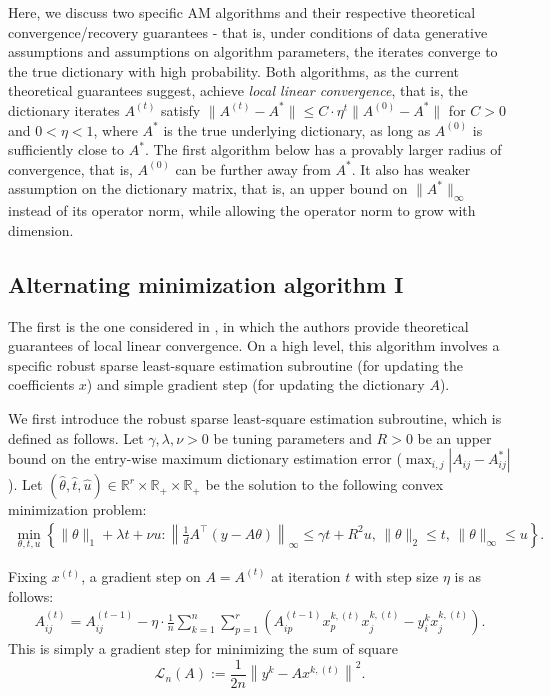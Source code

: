 Here, we discuss two specific AM algorithms and their respective theoretical convergence/recovery guarantees - that is, under conditions of data generative assumptions and assumptions on algorithm parameters, the iterates converge to the true dictionary with high probability. Both algorithms, as the current theoretical guarantees suggest, achieve \textit{local linear convergence}, that is, the dictionary iterates $A^{(t)}$ satisfy $\|A^{(t)} - A^*\| \leq C \cdot \eta^t \|A^{(0)} - A^*\|$ for $C>0$ and $0<\eta<1$, where $A^*$ is the true underlying dictionary, as long as $A^{(0)}$ is sufficiently close to $A^*$. The first algorithm below has a provably larger radius of convergence, that is, $A^{(0)}$ can be further away from $A^*$. It also has weaker assumption on the dictionary matrix, that is, an upper bound on $\|A^*\|_\infty$ instead of its operator norm, while allowing the operator norm to grow with dimension. 

\subsection{Alternating minimization algorithm I}

The first is the one considered in \cite{chatterji2017alternating}, in which the authors provide theoretical guarantees of local linear convergence. On a high level, this algorithm involves a specific robust sparse least-square estimation subroutine (for updating the coefficients $x$) and simple gradient step (for updating the dictionary $A$).

We first introduce the robust sparse least-square estimation subroutine, which is defined as follows. Let $\gamma, \lambda, \nu > 0$ be tuning parameters and $R>0$ be an upper bound on the entry-wise maximum dictionary estimation error ($\max_{i,j} |A_{ij} - A^*_{ij}|$). Let $(\hat{\theta}, \hat{t}, \hat{u})\in \mathbb{R}^r \times \mathbb{R}_+\times \mathbb{R}_+$ be the solution to the following convex minimization problem: 
\begin{align}
    \min_{\theta,t,u}\left\{ \|\theta\|_1 + \lambda t + \nu u : \left\|\frac{1}{d} A^\top (y- A\theta) \right\|_\infty\leq \gamma t + R^2 u,\, \|\theta\|_2 \leq t,\, \|\theta\|_\infty\leq u \right\}. \label{eq:mu-selector}
\end{align}

Fixing $x^{(t)}$, a gradient step on $A = A^{(t)}$ at iteration $t$ with step size $\eta$ is as follows: 
\begin{align}
   A_{ij}^{(t)} = A_{ij}^{(t-1)} - \eta\cdot \frac{1}{n} \sum_{k=1}^n \sum_{p=1}^r \left( A_{ip}^{(t-1)} x_p^{k, (t)} x_j^{k, (t)} - y_i^k x_j^{k, (t)} \right).  \label{eq:grad-step-A}
\end{align}
This is simply a gradient step for minimizing the sum of square
\begin{equation}
    \mathcal{L}_n(A) := \frac{1}{2n} \left\| y^k - A x^{k, (t)} \right\|^2. 
\end{equation}

